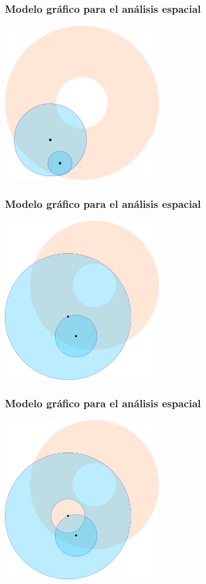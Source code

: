 \documentclass[handout]{beamer}
\theoremstyle{plain}
\theoremstyle{definition}
\theoremstyle{remark}
\begin{document}
\begin{frame}\frametitle{Modelo gráfico para el análisis espacial}
\centering
\includegraphics[width=0.5\textwidth]{path5815.png}
\end{frame}%

\begin{frame}\frametitle{Modelo gráfico para el análisis espacial}
\centering
\includegraphics[width=0.5\textwidth]{path5816.png}
\end{frame}%

\begin{frame}\frametitle{Modelo gráfico para el análisis espacial}
\centering
\includegraphics[width=0.5\textwidth]{path5817.png}
\end{frame}%
\end{document}
